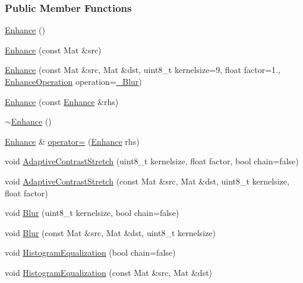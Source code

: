 \subsubsection*{Public Member Functions}
\begin{DoxyCompactItemize}
\item 
\hyperlink{class_vision_1_1_enhance_ac22cbe167e6de1ba724c2ad54dc6eafa}{Enhance} ()
\item 
\hyperlink{class_vision_1_1_enhance_af3872f07fef0911b32e81f6968b3d737}{Enhance} (const Mat \&src)
\item 
\hyperlink{class_vision_1_1_enhance_a5c09dcb8d1ae53757c19bc9d11604399}{Enhance} (const Mat \&src, Mat \&dst, uint8\+\_\+t kernelsize=9, float factor=1., \hyperlink{class_vision_1_1_enhance_a36caf2ddf5cb2575bfae8bcdca04e58e}{Enhance\+Operation} operation=\hyperlink{class_vision_1_1_enhance_a36caf2ddf5cb2575bfae8bcdca04e58ea5245bfc56341cd91a53b2fcb676c8fc8}{\+\_\+\+Blur})
\item 
\hyperlink{class_vision_1_1_enhance_acd901de386620bb44184e6929570dc09}{Enhance} (const \hyperlink{class_vision_1_1_enhance}{Enhance} \&rhs)
\item 
\hyperlink{class_vision_1_1_enhance_a21a664b0a5994ce163c3f8958adfd733}{$\sim$\+Enhance} ()
\item 
\hyperlink{class_vision_1_1_enhance}{Enhance} \& \hyperlink{class_vision_1_1_enhance_ab8663acdb0dbdb047f3e2d135a7faed2}{operator=} (\hyperlink{class_vision_1_1_enhance}{Enhance} rhs)
\item 
void \hyperlink{class_vision_1_1_enhance_a7aa0dfb4808ffc7abddd7fe4e30f6601}{Adaptive\+Contrast\+Stretch} (uint8\+\_\+t kernelsize, float factor, bool chain=false)
\item 
void \hyperlink{class_vision_1_1_enhance_acfe671366d83e6f1a8817395acae45e7}{Adaptive\+Contrast\+Stretch} (const Mat \&src, Mat \&dst, uint8\+\_\+t kernelsize, float factor)
\item 
void \hyperlink{class_vision_1_1_enhance_a5062a7481326dce9ab7ece19bc3b44c9}{Blur} (uint8\+\_\+t kernelsize, bool chain=false)
\item 
void \hyperlink{class_vision_1_1_enhance_ade17605655c40a18ed6511429e80710e}{Blur} (const Mat \&src, Mat \&dst, uint8\+\_\+t kernelsize)
\item 
void \hyperlink{class_vision_1_1_enhance_aa22bf01c06e941aa40e0075fac9aad8f}{Histogram\+Equalization} (bool chain=false)
\item 
void \hyperlink{class_vision_1_1_enhance_aa6be729d2eb1a1d8cf31682aa7be1077}{Histogram\+Equalization} (const Mat \&src, Mat \&dst)
\end{DoxyCompactItemize}
